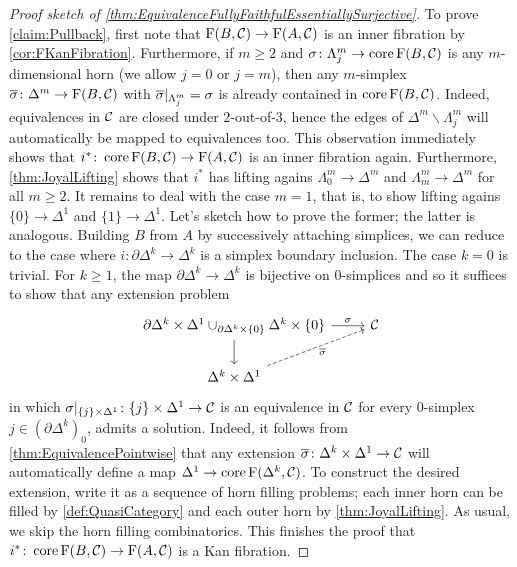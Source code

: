 \begin{proof}[Proof sketch of \cref{thm:EquivalenceFullyFaithfulEssentiallySurjective}]
	To prove \cref{claim:Pullback}, first note that $\operatorname{F}(B,\mathcal{C})\rightarrow \operatorname{F}(A,\mathcal{C})$ is an inner fibration by \cref{cor:FKanFibration}. Furthermore, if $m\geqslant 2$ and $\sigma\colon\Lambda_j^m\rightarrow \operatorname{core} \operatorname{F}(B,\mathcal{C})$ is any $m$-dimensional horn (we allow $j=0$ or $j=m$), then any $m$-simplex $\ov\sigma\colon \Delta^m\rightarrow \F(B,\Cc)$ with $\ov\sigma|_{\Lambda_j^m}=\sigma$ is already contained in $\operatorname{core} \operatorname{F}(B,\mathcal{C})$. Indeed, equivalences in $\mathcal{C}$ are closed under $2$-out-of-$3$, hence the edges of $\Delta^m\smallsetminus\Lambda_j^m$ will automatically be mapped to equivalences too. This observation immediately shows that $i^*\colon \operatorname{core}\operatorname{F}(B,\mathcal{C})\rightarrow \operatorname{F}(A,\mathcal{C})$ is an inner fibration again. Furthermore, \cref{thm:JoyalLifting} shows that $i^*$ has lifting agains $\Lambda_0^m\rightarrow\Delta^m$ and $\Lambda_m^m\rightarrow \Delta^m$ for all $m\geqslant 2$. It remains to deal with the case $m=1$, that is, to show lifting agains $\{0\}\rightarrow\Delta^1$ and $\{1\}\rightarrow\Delta^1$. Let's sketch how to prove the former; the latter is analogous. Building $B$ from $A$ by successively attaching simplices, we can reduce to the case where $i\colon \partial \Delta^k\rightarrow\Delta^k$ is a simplex boundary inclusion. The case $k=0$ is trivial. For $k\geqslant 1$, the map $\partial\Delta^k\rightarrow\Delta^k$ is bijective on $0$-simplices and so it suffices to show that any extension problem
	\begin{equation*}
		\begin{tikzcd}
			\partial\Delta^k\times\Delta^1\cup_{\partial\Delta^k\times\{0\}}\Delta^k\times\{0\}\rar["\sigma"]\dar & \Cc\\
			\Delta^k\times\Delta^1\urar[dashed,"\ov\sigma"'] & 
		\end{tikzcd}
	\end{equation*}
	in which $\sigma|_{\{j\}\times\Delta^1}\colon \{j\}\times\Delta^1\rightarrow\mathcal{C}$ is an equivalence in $\mathcal{C}$ for every $0$-simplex $j\in(\partial\Delta^k)_0$, admits a solution. Indeed, it follows from \cref{thm:EquivalencePointwise} that any extension $\ov\sigma\colon \Delta^k\times\Delta^1\rightarrow\Cc$ will automatically define a map $\Delta^1\rightarrow\operatorname{core}\operatorname{F}(\Delta^k,\mathcal{C})$. To construct the desired extension, write it as a sequence of horn filling problems; each inner horn can be filled by \cref{def:QuasiCategory} and each outer horn by \cref{thm:JoyalLifting}. As usual, we skip the horn filling combinatorics. This finishes the proof that $i^*\colon \operatorname{core}\operatorname{F}(B,\mathcal{C})\rightarrow\operatorname{F}(A,\mathcal{C})$ is a Kan fibration.
	

\end{proof}

